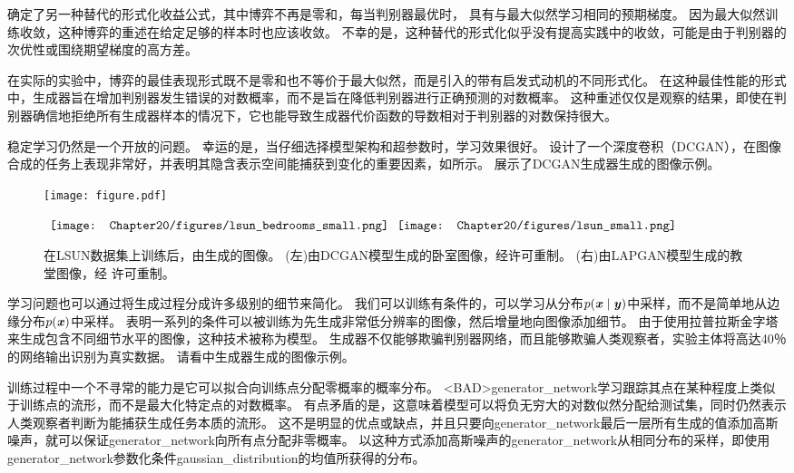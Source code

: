 \citet{Goodfellow-ICLR2015} 确定了另一种替代的形式化收益公式，其中博弈不再是零和，每当判别器最优时， 具有与最大似然学习相同的预期梯度。
因为最大似然训练收敛，这种博弈的重述在给定足够的样本时也应该收敛。
不幸的是，这种替代的形式化似乎没有提高实践中的收敛，可能是由于判别器的次优性或围绕期望梯度的高方差。


在实际的实验中，博弈的最佳表现形式既不是零和也不等价于最大似然，而是\citet{Goodfellow-et-al-NIPS2014-small}引入的带有启发式动机的不同形式化。
在这种最佳性能的形式中，生成器旨在增加判别器发生错误的对数概率，而不是旨在降低判别器进行正确预测的对数概率。
这种重述仅仅是观察的结果，即使在判别器确信地拒绝所有生成器样本的情况下，它也能导致生成器代价函数的导数相对于判别器的对数保持很大。

稳定学习仍然是一个开放的问题。
幸运的是，当仔细选择模型架构和超参数时，学习效果很好。
\citet{radford2015unsupervised}设计了一个深度卷积（DCGAN），在图像合成的任务上表现非常好，并表明其隐含表示空间能捕获到变化的重要因素，如所示。
展示了DCGAN生成器生成的图像示例。
 
\begin{figure}[!htb]
\ifOpenSource
\centerline{\texttt{[image: figure.pdf]}}
\else
\centering
$\vcenter{\hbox{
\texttt{[image: Chapter20/figures/lsun\_bedrooms\_small.png]}
}}
\vcenter{\hbox{
\texttt{[image: Chapter20/figures/lsun\_small.png]}
}}$
\fi
\caption{在LSUN数据集上训练后，由生成的图像。
(左)由DCGAN模型生成的卧室图像，经\citet{radford2015unsupervised}许可重制。
(右)由LAPGAN模型生成的教堂图像，经 \citet{denton2015deep}许可重制。
}
\label{fig:chap20_lsun_small}
\end{figure}

学习问题也可以通过将生成过程分成许多级别的细节来简化。
我们可以训练有条件的\citep{mirza2014conditional}，可以学习从分布$p(\boldsymbol{\mathit{x}} \mid \boldsymbol{\mathit{y}})$中采样，而不是简单地从边缘分布$p(\boldsymbol{\mathit{x}})$中采样。
\citet{denton2015deep} 表明一系列的条件可以被训练为先生成非常低分辨率的图像，然后增量地向图像添加细节。
由于使用拉普拉斯金字塔来生成包含不同细节水平的图像，这种技术被称为模型。
生成器不仅能够欺骗判别器网络，而且能够欺骗人类观察者，实验主体将高达40％的网络输出识别为真实数据。
请看中生成器生成的图像示例。


训练过程中一个不寻常的能力是它可以拟合向训练点分配零概率的概率分布。
<BAD>\gls{generator_network}学习跟踪其点在某种程度上类似于训练点的流形，而不是最大化特定点的对数概率。
有点矛盾的是，这意味着模型可以将负无穷大的对数似然分配给测试集，同时仍然表示人类观察者判断为能捕获生成任务本质的流形。
这不是明显的优点或缺点，并且只要向\gls{generator_network}最后一层所有生成的值添加高斯噪声，就可以保证\gls{generator_network}向所有点分配非零概率。
以这种方式添加高斯噪声的\gls{generator_network}从相同分布的采样，即使用\gls{generator_network}参数化条件\gls{gaussian_distribution}的均值所获得的分布。

